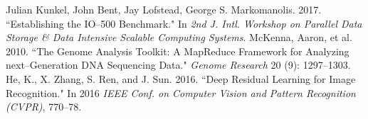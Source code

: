 \documentclass[conference]{IEEEtran}
\begin{document}
\begin{thebibliography}{9}
 Julian Kunkel, John Bent, Jay Lofstead, George S. Markomanolis. 2017. ``Establishing the IO--500 Benchmark." In \textit{2nd J. Intl. Workshop on Parallel Data Storage \& Data Intensive Scalable Computing Systems}.
 McKenna, Aaron, et al. 2010. ``The Genome Analysis Toolkit: A MapReduce Framework for Analyzing next--Generation DNA Sequencing Data." \textit{Genome Research} 20 (9): 1297–1303.
 He, K., X. Zhang, S. Ren, and J. Sun. 2016. ``Deep Residual Learning for Image Recognition." In 2016 \textit{IEEE Conf. on Computer Vision and Pattern Recognition (CVPR)}, 770–78.
\end{thebibliography}
\end{document}
